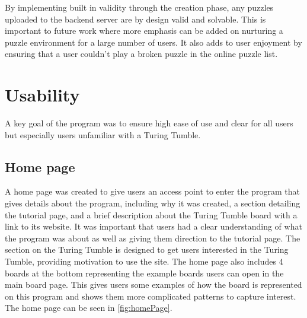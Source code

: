 \documentclass{l4proj}
\begin{document}
By implementing built in validity through the creation phase, any puzzles uploaded to the backend server are by design valid and solvable. This is important to future work where more emphasis can be added on nurturing a puzzle environment for a large number of users. It also adds to user enjoyment by ensuring that a user couldn't play a broken puzzle in the online puzzle list.



\section{Usability}
A key goal of the program was to ensure high ease of use and clear for all users but especially users unfamiliar with a Turing Tumble. 

\subsection{Home page}
A home page was created to give users an access point to enter the program that gives details about the program, including why it was created, a section detailing the tutorial page, and a brief description about the Turing Tumble board with a link to its website. It was important that users had a clear understanding of what the program was about as well as giving them direction to the tutorial page. The section on the Turing Tumble is designed to get users interested in the Turing Tumble, providing motivation to use the site. The home page also includes 4 boards at the bottom representing the example boards users can open in the main board page. This gives users some examples of how the board is represented on this program and shows them more complicated patterns to capture interest. The home page can be seen in \ref{fig:homePage}.
\end{document}

